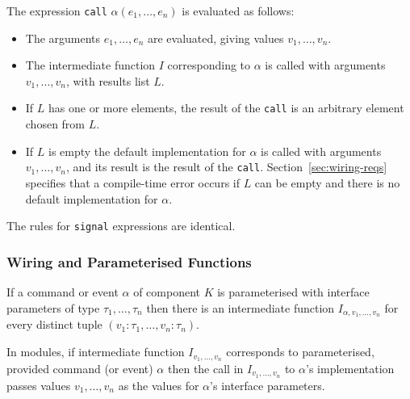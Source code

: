 \documentclass[11pt]{article}
\newcommand{\code}[1]{{\tt #1}}
\begin{document}
The expression \code{call} $\alpha(e_1, \ldots, e_n)$ is evaluated as
follows:
\begin{itemize}
\item The arguments $e_1, \ldots, e_n$ are evaluated, giving values $v_1,
\ldots, v_n$.
\item The intermediate function $I$ corresponding to $\alpha$ is called
with arguments $v_1, \ldots, v_n$, with results list $L$.
\item If $L$ has one or more elements, the result of the \code{call} is an
arbitrary element chosen from $L$.
\item If $L$ is empty the default implementation for $\alpha$ is
called with arguments $v_1, \ldots, v_n$, and its result is the result of
the \code{call}. Section~\ref{sec:wiring-reqs} specifies that a
compile-time error occurs if $L$ can be empty and there is no default
implementation for $\alpha$.
\end{itemize}
The rules for \code{signal} expressions are identical.

\subsubsection{Wiring and Parameterised Functions}
\label{sec:wiring-parms}

If a command or event $\alpha$ of component $K$ is parameterised with
interface parameters of type $\tau_1, \ldots, \tau_n$ then there is an
intermediate function $I_{\alpha,v_1,\ldots,v_n}$ for every distinct tuple
$(v_1:\tau_1, \ldots, v_n:\tau_n)$.

In modules, if intermediate function $I_{v_1, \ldots, v_n}$ corresponds
to parameterised, provided command (or event) $\alpha$ then the call in
$I_{v_1, \ldots, v_n}$ to $\alpha$'s implementation passes values $v_1,
\ldots, v_n$ as the values for $\alpha$'s interface parameters. 
\end{document}
